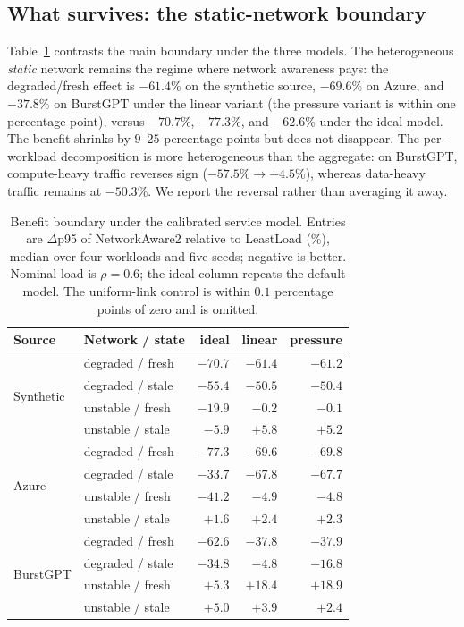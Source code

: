 \subsection{What survives: the static-network boundary}
Table~\ref{tab:calibrated-main} contrasts the main boundary under the three models. The
heterogeneous \emph{static} network remains the regime where network awareness pays: the
degraded/fresh effect is $-61.4\%$ on the synthetic source, $-69.6\%$ on Azure, and $-37.8\%$ on
BurstGPT under the linear variant (the pressure variant is within one percentage point), versus
$-70.7\%$, $-77.3\%$, and $-62.6\%$ under the ideal model. The benefit shrinks by $9$--$25$
percentage points but does not disappear. The per-workload decomposition is more heterogeneous
than the aggregate: on BurstGPT, compute-heavy traffic reverses sign ($-57.5\%\rightarrow+4.5\%$),
whereas data-heavy traffic remains at $-50.3\%$. We report the reversal rather than averaging it
away.

\begin{table}[t]
\centering
\caption{Benefit boundary under the calibrated service model. Entries are $\Delta$p95 of
NetworkAware2 relative to LeastLoad (\%), median over four workloads and five seeds; negative is
better. Nominal load is $\rho=0.6$; the ideal column repeats the default model. The uniform-link
control is within $0.1$ percentage points of zero and is omitted.}
\label{tab:calibrated-main}
\small
\setlength{\tabcolsep}{4pt}
\begin{tabular}{@{}llrrr@{}}
\toprule
Source & Network / state & ideal & linear & pressure \\
\midrule
\multirow{4}{*}{Synthetic}
 & degraded / fresh & $-70.7$ & $-61.4$ & $-61.2$ \\
 & degraded / stale & $-55.4$ & $-50.5$ & $-50.4$ \\
 & unstable / fresh & $-19.9$ & $-0.2$  & $-0.1$  \\
 & unstable / stale & $-5.9$  & $+5.8$  & $+5.2$  \\
\midrule
\multirow{4}{*}{Azure}
 & degraded / fresh & $-77.3$ & $-69.6$ & $-69.8$ \\
 & degraded / stale & $-33.7$ & $-67.8$ & $-67.7$ \\
 & unstable / fresh & $-41.2$ & $-4.9$  & $-4.8$  \\
 & unstable / stale & $+1.6$  & $+2.4$  & $+2.3$  \\
\midrule
\multirow{4}{*}{BurstGPT}
 & degraded / fresh & $-62.6$ & $-37.8$ & $-37.9$ \\
 & degraded / stale & $-34.8$ & $-4.8$  & $-16.8$ \\
 & unstable / fresh & $+5.3$  & $+18.4$ & $+18.9$ \\
 & unstable / stale & $+5.0$  & $+3.9$  & $+2.4$  \\
\bottomrule
\end{tabular}
\end{table}

